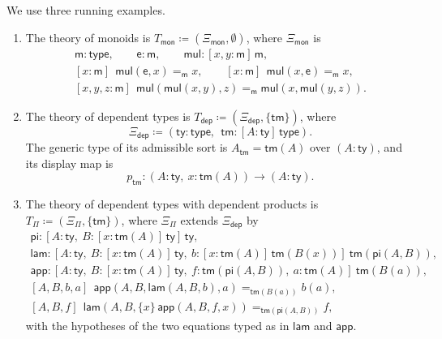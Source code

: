 \begin{example}\label{ex:theories}
    We use three running examples.
    \begin{enumerate}
        \item The theory of monoids is $T_{\mathsf{mon}} \coloneqq (\Xi_{\mathsf{mon}}, \emptyset)$, where $\Xi_{\mathsf{mon}}$ is
        \begin{gather*}
            \mathsf{m} : \mathsf{type}, \qquad \mathsf{e} : \mathsf{m}, \qquad \mathsf{mul} : [x, y : \mathsf{m}]\,\mathsf{m},\\
            [x : \mathsf{m}]\ \ \mathsf{mul}(\mathsf{e}, x) =_{\mathsf{m}} x, \qquad [x : \mathsf{m}]\ \ \mathsf{mul}(x, \mathsf{e}) =_{\mathsf{m}} x,\\
            [x, y, z : \mathsf{m}]\ \ \mathsf{mul}(\mathsf{mul}(x, y), z) =_{\mathsf{m}} \mathsf{mul}(x, \mathsf{mul}(y, z)).
        \end{gather*}
        \item The theory of dependent types is $T_{\mathsf{dep}} \coloneqq (\Xi_{\mathsf{dep}}, \{\mathsf{tm}\})$, where
        \[
            \Xi_{\mathsf{dep}} \coloneqq (\mathsf{ty} : \mathsf{type},\ \ \mathsf{tm} : [A : \mathsf{ty}]\,\mathsf{type}).
        \]
        The generic type of its admissible sort is $A_{\mathsf{tm}} = \mathsf{tm}(A)$ over $(A : \mathsf{ty})$, and its display map is
        \[
            p_{\mathsf{tm}} : (A : \mathsf{ty},\ x : \mathsf{tm}(A)) \to (A : \mathsf{ty}).
        \]
        \item The theory of dependent types with dependent products is $T_\Pi \coloneqq (\Xi_\Pi, \{\mathsf{tm}\})$, where $\Xi_\Pi$ extends $\Xi_{\mathsf{dep}}$ by
        \begin{gather*}
            \mathsf{pi} : [A : \mathsf{ty},\ B : [x : \mathsf{tm}(A)]\,\mathsf{ty}]\,\mathsf{ty},\\
            \mathsf{lam} : [A : \mathsf{ty},\ B : [x : \mathsf{tm}(A)]\,\mathsf{ty},\ b : [x : \mathsf{tm}(A)]\,\mathsf{tm}(B(x))]\ \mathsf{tm}(\mathsf{pi}(A, B)),\\
            \mathsf{app} : [A : \mathsf{ty},\ B : [x : \mathsf{tm}(A)]\,\mathsf{ty},\ f : \mathsf{tm}(\mathsf{pi}(A, B)),\ a : \mathsf{tm}(A)]\ \mathsf{tm}(B(a)),\\
            [A, B, b, a]\ \ \mathsf{app}(A, B, \mathsf{lam}(A, B, b), a) =_{\mathsf{tm}(B(a))} b(a),\\
            [A, B, f]\ \ \mathsf{lam}(A, B, \{x\}\,\mathsf{app}(A, B, f, x)) =_{\mathsf{tm}(\mathsf{pi}(A, B))} f,
        \end{gather*}
        with the hypotheses of the two equations typed as in $\mathsf{lam}$ and $\mathsf{app}$.
    \end{enumerate}
\end{example}

